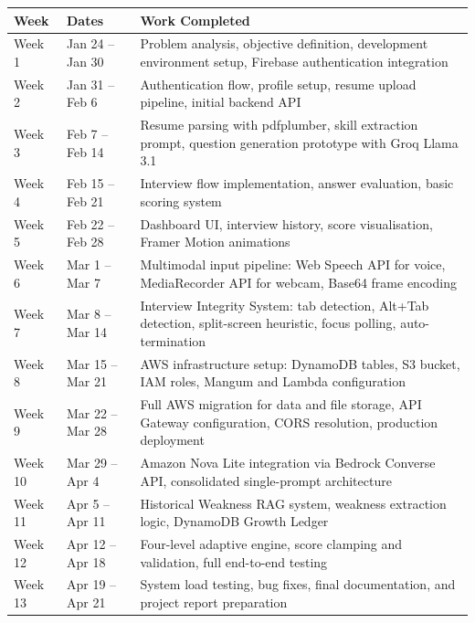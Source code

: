 \documentclass[12pt,a4paper]{article}
\begin{document}
\begin{longtable}{|p{2cm}|p{3.5cm}|p{7cm}|}
\hline
\textbf{Week} & \textbf{Dates} & \textbf{Work Completed} \\
\hline
Week 1 & Jan 24 -- Jan 30 & Problem analysis, objective definition, development environment setup, Firebase authentication integration \\
\hline
Week 2 & Jan 31 -- Feb 6 & Authentication flow, profile setup, resume upload pipeline, initial backend API \\
\hline
Week 3 & Feb 7 -- Feb 14 & Resume parsing with pdfplumber, skill extraction prompt, question generation prototype with Groq Llama 3.1 \\
\hline
Week 4 & Feb 15 -- Feb 21 & Interview flow implementation, answer evaluation, basic scoring system \\
\hline
Week 5 & Feb 22 -- Feb 28 & Dashboard UI, interview history, score visualisation, Framer Motion animations \\
\hline
Week 6 & Mar 1 -- Mar 7 & Multimodal input pipeline: Web Speech API for voice, MediaRecorder API for webcam, Base64 frame encoding \\
\hline
Week 7 & Mar 8 -- Mar 14 & Interview Integrity System: tab detection, Alt+Tab detection, split-screen heuristic, focus polling, auto-termination \\
\hline
Week 8 & Mar 15 -- Mar 21 & AWS infrastructure setup: DynamoDB tables, S3 bucket, IAM roles, Mangum and Lambda configuration \\
\hline
Week 9 & Mar 22 -- Mar 28 & Full AWS migration for data and file storage, API Gateway configuration, CORS resolution, production deployment \\
\hline
Week 10 & Mar 29 -- Apr 4 & Amazon Nova Lite integration via Bedrock Converse API, consolidated single-prompt architecture \\
\hline
Week 11 & Apr 5 -- Apr 11 & Historical Weakness RAG system, weakness extraction logic, DynamoDB Growth Ledger \\
\hline
Week 12 & Apr 12 -- Apr 18 & Four-level adaptive engine, score clamping and validation, full end-to-end testing \\
\hline
Week 13 & Apr 19 -- Apr 21 & System load testing, bug fixes, final documentation, and project report preparation \\
\hline
\end{longtable}

\newpage

\end{document}
